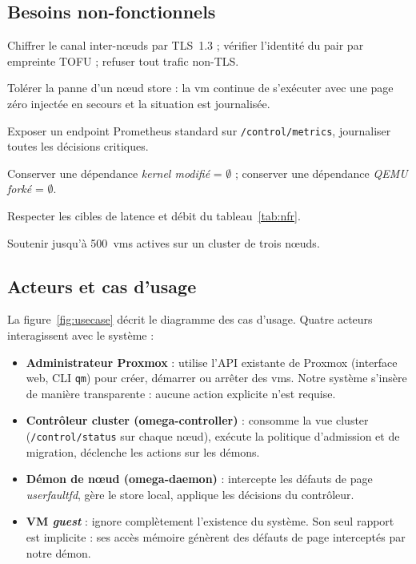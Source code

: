 \subsection{Besoins non-fonctionnels}

\begin{description}[leftmargin=2.2cm,style=nextline]
    \item[BNF-01. Sécurité.] Chiffrer le canal inter-nœuds par TLS~1.3 ; vérifier l'identité du pair par empreinte TOFU ; refuser tout trafic non-TLS.
    \item[BNF-02. Résilience.] Tolérer la panne d'un nœud store : la \acrshort{vm} continue de s'exécuter avec une page zéro injectée en secours et la situation est journalisée.
    \item[BNF-03. Observabilité.] Exposer un endpoint Prometheus standard sur \texttt{/control/metrics}, journaliser toutes les décisions critiques.
    \item[BNF-04. Maintenabilité.] Conserver une dépendance \emph{kernel modifié} = $\emptyset$ ; conserver une dépendance \emph{QEMU forké} = $\emptyset$.
    \item[BNF-05. Performance.] Respecter les cibles de latence et débit du tableau~\ref{tab:nfr}.
    \item[BNF-06. Scalabilité.] Soutenir jusqu'à 500~\acrshort{vm}s actives sur un cluster de trois nœuds.
\end{description}

\subsection{Acteurs et cas d'usage}

La figure~\ref{fig:usecase} décrit le diagramme des cas d'usage. Quatre acteurs interagissent avec le système :

\begin{itemize}[leftmargin=*]
    \item \textbf{Administrateur Proxmox} : utilise l'API existante de Proxmox (interface web, CLI \texttt{qm}) pour créer, démarrer ou arrêter des \acrshort{vm}s. Notre système s'insère de manière transparente : aucune action explicite n'est requise.
    \item \textbf{Contrôleur cluster (omega-controller)} : consomme la vue cluster (\texttt{/control/status} sur chaque nœud), exécute la politique d'admission et de migration, déclenche les actions sur les démons.
    \item \textbf{Démon de nœud (omega-daemon)} : intercepte les défauts de page \emph{userfaultfd}, gère le store local, applique les décisions du contrôleur.
    \item \textbf{VM \emph{guest}} : ignore complètement l'existence du système. Son seul rapport est implicite : ses accès mémoire génèrent des défauts de page interceptés par notre démon.
\end{itemize}

